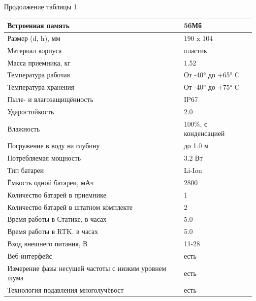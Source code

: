 \documentclass[a4paper]{article}
\begin{document}
\begin{newpage}

    \begin{center}
        \begin{flushleft}
            Продолжение таблицы 1.
        \end{flushleft}
        \begin{tabular}{ | p{200pt} | p{260pt} | }
            \hline
            Встроенная память  & 56Мб\\
            \hline
            Размер (d, h), мм & 190 x 104\\
            \hline
             Материал корпуса & пластик\\
            \hline
            Масса приемника, кг & 1.52\\
            \hline
            Температура рабочая & От -40° до +65° C\\
            \hline
            Температура хранения & От -40° до +75° C\\
            \hline
            Пыле- и влагозащищённость & IP67\\
            \hline
            Ударостойкость & 2.0\\
            \hline
            Влажность & 100\%, с конденсацией\\
            \hline
            Погружение в воду на глубину & до 1.0 м\\
            \hline
            Потребляемая мощность & 3.2 Вт\\
            \hline
            Тип батареи & Li-Ion\\
            \hline
            Ёмкость одной батареи, мАч & 2800\\
            \hline
            Количество батарей в приемнике & 1\\
            \hline
            Количество батарей в штатном комплекте & 2\\
            \hline
            Время работы в Статике, в часах & 5.0\\
            \hline
            Время работы в RTK, в часах & 5.0\\
            \hline
            Вход внешнего питания, В & 11-28\\
            \hline
            Веб-интерфейс & есть\\
            \hline
            Измерение фазы несущей частоты с низким уровнем шума & есть\\
            \hline
            Технология подавления многолучёвост & есть\\
            \hline
            
        \end{tabular}
    \end{center}

\end{newpage}
\end{document}
